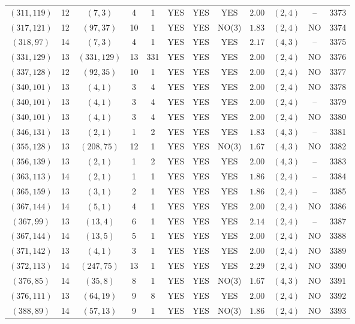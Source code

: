 \begin{longtable}{|c|c|c|c|c|c|c|c|c|c|c|c|}
$(311,119)$ & 12 & $(7,3)$ & 4 & 1 & YES & YES & YES & $2.00$ & $(2,4)$ & -- & 3373\\
$(317,121)$ & 12 & $(97,37)$ & 10 & 1 & YES & YES & NO(3) & $1.83$ & $(2,4)$ & NO & 3374\\
$(318,97)$ & 14 & $(7,3)$ & 4 & 1 & YES & YES & YES & $2.17$ & $(4,3)$ & -- & 3375\\
$(331,129)$ & 13 & $(331,129)$ & 13 & 331 & YES & YES & YES & $2.00$ & $(2,4)$ & NO & 3376\\
$(337,128)$ & 12 & $(92,35)$ & 10 & 1 & YES & YES & YES & $2.00$ & $(2,4)$ & NO & 3377\\
$(340,101)$ & 13 & $(4,1)$ & 3 & 4 & YES & YES & YES & $2.00$ & $(2,4)$ & NO & 3378\\
$(340,101)$ & 13 & $(4,1)$ & 3 & 4 & YES & YES & YES & $2.00$ & $(2,4)$ & -- & 3379\\
$(340,101)$ & 13 & $(4,1)$ & 3 & 4 & YES & YES & YES & $2.00$ & $(2,4)$ & NO & 3380\\
$(346,131)$ & 13 & $(2,1)$ & 1 & 2 & YES & YES & YES & $1.83$ & $(4,3)$ & -- & 3381\\
$(355,128)$ & 13 & $(208,75)$ & 12 & 1 & YES & YES & NO(3) & $1.67$ & $(4,3)$ & NO & 3382\\
$(356,139)$ & 13 & $(2,1)$ & 1 & 2 & YES & YES & YES & $2.00$ & $(4,3)$ & -- & 3383\\
$(363,113)$ & 14 & $(2,1)$ & 1 & 1 & YES & YES & YES & $1.86$ & $(2,4)$ & -- & 3384\\
$(365,159)$ & 13 & $(3,1)$ & 2 & 1 & YES & YES & YES & $1.86$ & $(2,4)$ & -- & 3385\\
$(367,144)$ & 14 & $(5,1)$ & 4 & 1 & YES & YES & YES & $2.00$ & $(2,4)$ & NO & 3386\\
$(367,99)$ & 13 & $(13,4)$ & 6 & 1 & YES & YES & YES & $2.14$ & $(2,4)$ & -- & 3387\\
$(367,144)$ & 14 & $(13,5)$ & 5 & 1 & YES & YES & YES & $2.00$ & $(2,4)$ & NO & 3388\\
$(371,142)$ & 13 & $(4,1)$ & 3 & 1 & YES & YES & YES & $2.00$ & $(2,4)$ & NO & 3389\\
$(372,113)$ & 14 & $(247,75)$ & 13 & 1 & YES & YES & YES & $2.29$ & $(2,4)$ & NO & 3390\\
$(376,85)$ & 14 & $(35,8)$ & 8 & 1 & YES & YES & NO(3) & $1.67$ & $(4,3)$ & NO & 3391\\
$(376,111)$ & 13 & $(64,19)$ & 9 & 8 & YES & YES & YES & $2.00$ & $(2,4)$ & NO & 3392\\
$(388,89)$ & 14 & $(57,13)$ & 9 & 1 & YES & YES & NO(3) & $1.86$ & $(2,4)$ & NO & 3393\\

\end{longtable}
